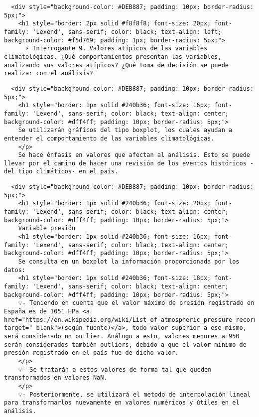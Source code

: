 \documentclass[11pt]{article}
\begin{document}
    \begin{verbatim}
  <div style="background-color: #DEB887; padding: 10px; border-radius: 5px;">
    <h1 style="border: 2px solid #f8f8f8; font-size: 20px; font-family: 'Lexend', sans-serif; color: black; text-align: left; background-color: #f5d769; padding: 1px; border-radius: 5px;">
      ⚡ Interrogante 9. Valores atípicos de las variables climatológicas. ¿Qué comportamientos presentan las variables, analizando sus valores atípicos? ¿Qué toma de decisión se puede realizar con el análisis?
\end{verbatim}

    \begin{verbatim}
  <div style="background-color: #DEB887; padding: 10px; border-radius: 5px;">
    <h1 style="border: 1px solid #240b36; font-size: 16px; font-family: 'Lexend', sans-serif; color: black; text-align: center; background-color: #dff4ff; padding: 10px; border-radius: 5px;">
    Se utilizarán gráficos del tipo boxplot, los cuales ayudan a entender el comportamiento de las variables climatológicas.
    </p>
    Se hace énfasis en valores que afectan al análisis. Esto se puede llevar por el camino de hacer una revisión de los eventos históricos -del tipo climáticos- en el país.
\end{verbatim}

    \begin{verbatim}
  <div style="background-color: #DEB887; padding: 10px; border-radius: 5px;">
    <h1 style="border: 1px solid #240b36; font-size: 20px; font-family: 'Lexend', sans-serif; color: black; text-align: center; background-color: #dff4ff; padding: 10px; border-radius: 5px;">
    Variable presión
    <h1 style="border: 1px solid #240b36; font-size: 16px; font-family: 'Lexend', sans-serif; color: black; text-align: center; background-color: #dff4ff; padding: 10px; border-radius: 5px;">
    Se consulta en un boxplot la información proporcionada por los datos:
    <h1 style="border: 1px solid #240b36; font-size: 18px; font-family: 'Lexend', sans-serif; color: black; text-align: center; background-color: #dff4ff; padding: 10px; border-radius: 5px;">
    💡- Teniendo en cuenta que el valor máximo de presión registrado en España es de 1051 HPa <a href="https://en.wikipedia.org/wiki/List_of_atmospheric_pressure_records_in_Europe#Iberia" target="_blank">(según fuente)</a>, todo valor superior a ese mismo, será considerado un outlier. Análogo a esto, valores menores a 950 serán considerados también outliers, debido a que el valor mínimo de presión registrado en el país fue de dicho valor.
    </p>
    💡- Se tratarán a estos valores de forma tal que queden transformados en valores NaN.
    </p>
    💡- Posteriormente, se utilizará el metodo de interpolación lineal para transformarlos nuevamente en valores numéricos y útiles en el análisis.
\end{verbatim}
\end{document}
